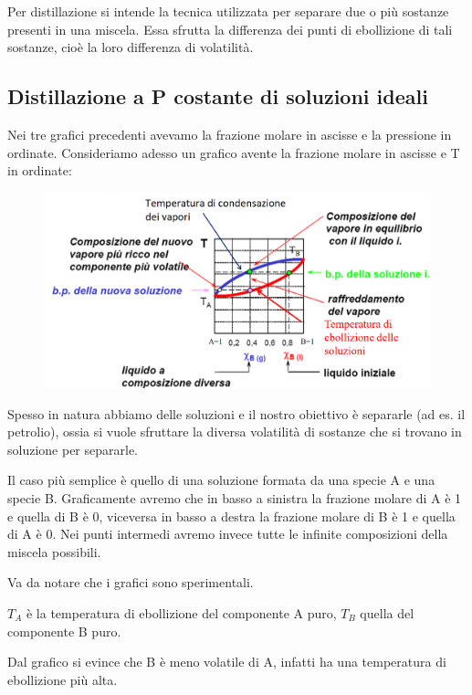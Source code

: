 Per distillazione si intende la tecnica utilizzata per separare due o più sostanze presenti in una miscela. Essa sfrutta la differenza dei punti di ebollizione di tali sostanze, cioè la loro differenza di volatilità.

\vspace{-0.3cm}\subsection{Distillazione a P costante di soluzioni ideali}
Nei tre grafici precedenti avevamo la frazione molare in ascisse e la pressione in ordinate. Consideriamo adesso un grafico avente la frazione molare in ascisse e T in ordinate:

\vspace{-0.5cm}\begin{figure}[H]
    \centering
    \includegraphics[width=14.3cm]{immagini/distillazione_ideale.png}
\end{figure}

Spesso in natura abbiamo delle soluzioni e il nostro obiettivo è separarle (ad es. il petrolio), ossia si vuole sfruttare la diversa volatilità di sostanze che si trovano in soluzione per separarle.

Il caso più semplice è quello di una soluzione formata da una specie A e una specie B. Graficamente avremo che in basso a sinistra la frazione molare di A è 1 e quella di B è 0, viceversa in basso a destra la frazione molare di B è 1 e quella di A è 0. Nei punti intermedi avremo invece tutte le infinite composizioni della miscela possibili.

Va da notare che i grafici sono sperimentali.

$T_A$ è la temperatura di ebollizione del componente A puro, $T_B$ quella del componente B puro.

Dal grafico si evince che B è meno volatile di A, infatti ha una temperatura di ebollizione più alta.

